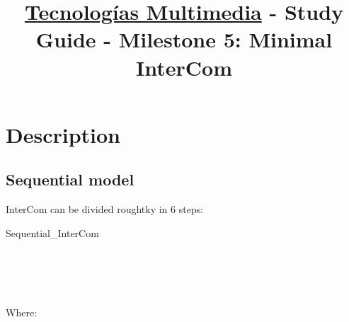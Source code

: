 \title{\href{https://www.ual.es/estudios/grados/presentacion/plandeestudios/asignatura/4015/40154321?idioma=zh_CN}{Tecnologías Multimedia} - Study Guide - Milestone 5: Minimal InterCom}

\maketitle

\section{Description}

\subsection{Sequential model}

InterCom can be divided roughtky in 6 steps:

\begin{pseudocode}{Sequential\_InterCom}{~}
  \BEGIN
     \GETS {}\\
     \GETS {}\\
    \\
     \GETS {}\\
     \GETS {}\\
  \END
\end{pseudocode}

Where:

